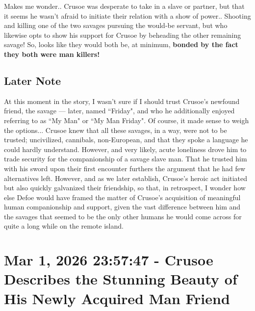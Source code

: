 \documentclass[a4paper]{article}
\begin{document}
Makes me wonder.. Crusoe was desperate to take in a slave or partner, but that it seems he wasn't afraid to initiate their relation with a show of power.. Shooting and killing one of the two savages pursuing the would-be servant, but who likewise opts to show his support for Crusoe by beheading the other remaining savage! So, looks like they would both be, at minimum, \textbf{bonded by the fact they both were man killers!}


\subsection{Later Note}


At this moment in the story, I wasn't sure if I should trust Crusoe's newfound friend, the savage --- later, named ``Friday", and who he additionally enjoyed referring to as ``My Man" or ``My Man Friday". Of course, it made sense to weigh the options... Crusoe knew that all these savages, in a way, were not to be trusted; uncivilized, cannibals, non-European, and that they spoke a language he could hardly understand. However, and very likely, acute loneliness drove him to trade security for the companionship of a savage slave man. That he trusted him with his sword upon their first encounter furthers the argument that he had few alternatives left. However, and as we later establish, Crusoe's heroic act initiated but also quickly galvanized their friendship, so that, in retrospect, I wonder how else Defoe would have framed the matter of Crusoe's acquisition of meaningful human companionship and support, given the vast difference between him and the savages that seemed to be the only other humans he would come across for quite a long while on the remote island.




\section{Mar 1, 2026 23:57:47 - Crusoe Describes the Stunning Beauty of His Newly Acquired Man Friend}
\label{SEC51}
\end{document}
